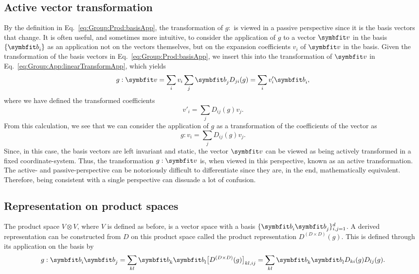 \subsection{Active vector transformation}
By the definition in Eq.~\eqref{eq:Group:Prod:basisApp}, the transformation of $g:$ is viewed in a passive perspective since it is the basis vectors that change.
It is often useful, and sometimes more intuitive, to consider the application of $g$ to a vector $\v{v}$ in the basis $\{\v{b}_i\}$ as an application not
on the vectors themselves, but on the expansion coefficients $v_i$ of $\v{v}$ in the basis. Given the transformation of the basis vectors in
Eq.~\eqref{eq:Group:Prod:basisApp}, we insert this into the transformation of $\v{v}$ in Eq.~\eqref{eq:Group:App:linearTransformApp}, which yields
\begin{equation}
    \label{eq:Group:App:activeTransform}
        g:\v{v} = \sum_iv_i\sum_j\v{b}_jD_{ji}(g) = \sum_iv'_i\v{b}_i,
\end{equation}
where we have defined the transformed coefficients
\begin{equation}
    \label{eq:Group:App:transformedCoeff}
    v'_i = \sum_jD_{ij}(g)v_j.
\end{equation}
From this calculation, we see that we can consider the application of $g$ as a transformation of the coefficients of the vector as
\begin{equation}
    \label{eq:Group:App:coeffTransformation}
    g:v_i = \sum_jD_{ij}(g)v_j.
\end{equation}
Since, in this case, the basis vectors are left invariant and static, the vector $\v{v}$ can be viewed as being actively transformed in a fixed coordinate-system. 
Thus, the transformation $g:\v{v}$ is, when viewed in this perspective, known as an active transformation. The active- and passive-perspective can be notoriously
difficult to differentiate since they are, in the end, mathematically equivalent. Therefore, being consistent with a single perspective can dissuade a lot of confusion.

\subsection{Representation on product spaces}

The product space $V\otimes V$, where $V$ is defined as before, is a vector space with a basis $\{\v{b}_i\v{b}_j\}_{i,j=1}^d$. A derived representation can be constructed from $D$ on this product space
called the product representation $D^{(D\times D)}(g)$. This is defined through its application on the basis by
\begin{equation}
    \label{eq:Group:Prod:prodBasisApp}
    g:\v{b}_i\v{b}_j = \sum_{kl}\v{b}_k\v{b}_l\big[D^{(D\times D)}(g)\big]_{kl,ij} = \sum_{kl}\v{b}_k\v{b}_lD_{ki}(g)D_{lj}(g).
\end{equation}

